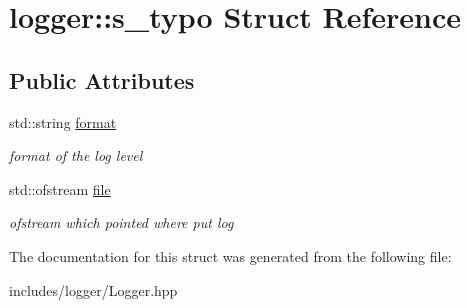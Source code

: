 \hypertarget{structlogger_1_1s__typo}{}\section{logger\+:\+:s\+\_\+typo Struct Reference}
\label{structlogger_1_1s__typo}
\subsection*{Public Attributes}
\begin{DoxyCompactItemize}
\item 
\mbox{\label{structlogger_1_1s__typo_a4523814ca3b3d3c7596bb5651c1376bc}} 
std\+::string \hyperlink{structlogger_1_1s__typo_a4523814ca3b3d3c7596bb5651c1376bc}{format}
\begin{DoxyCompactList}\small\item\em format of the log level \end{DoxyCompactList}\item 
\mbox{\label{structlogger_1_1s__typo_af125bb498bedcab1c10cc31fe5342972}} 
std\+::ofstream \hyperlink{structlogger_1_1s__typo_af125bb498bedcab1c10cc31fe5342972}{file}
\begin{DoxyCompactList}\small\item\em ofstream which pointed where put log \end{DoxyCompactList}\end{DoxyCompactItemize}


The documentation for this struct was generated from the following file\+:\begin{DoxyCompactItemize}
\item 
includes/logger/Logger.\+hpp\end{DoxyCompactItemize}
